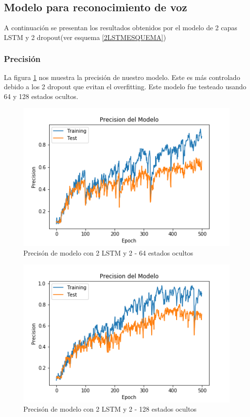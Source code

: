 \subsection{Modelo para reconocimiento de voz}
A continuación se presentan los resultados obtenidos por el modelo de 2 capas LSTM y 2 dropout(ver esquema \ref{2LSTMESQUEMA})
\subsubsection{Precisión}
La figura \ref{fig:modelprec} nos muestra la precisión de nuestro modelo. Este es más controlado debido a los 2 dropout que evitan el overfitting. Este modelo fue testeado usando 64 y 128 estados ocultos.

\begin{figure}[H]
	\centering
	\includegraphics[width=0.7\linewidth]{Figures/MODEL_prec}
	\caption{Precisón de modelo con 2 LSTM y 2 - 64 estados ocultos}
	\label{fig:modelprec}
\end{figure}	

\begin{figure}
	\centering
	\includegraphics[width=0.7\linewidth]{Figures/prec500}
	\caption{Precisón de modelo con 2 LSTM y 2 - 128 estados ocultos }
	\label{fig:prec500}
\end{figure}

